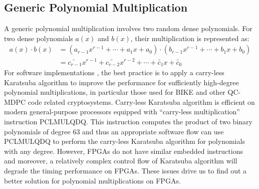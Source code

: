 \documentclass[runningheads]{llncs}
\begin{document}
\subsection{Generic Polynomial Multiplication}
\label{sub::dense}
A generic polynomial multiplication involves two random dense polynomials.
For two dense polynomials $a(x)$ and $b(x)$, their multiplication is represented as:
\begin{align}
    a(x)\cdot b(x) &= (a_{r-1}x^{r-1}+\cdots + a_{1}x + a_0)\cdot(b_{r-1}x^{r-1}+\cdots + b_{1}x + b_0)\\
    &= \widetilde{c_{r-1}}x^{r-1}+\widetilde{c_{r-2}}x^{r-2}+\cdots + \widetilde{c_{1}}x +\widetilde{c_0}
\end{align}
%
For software implementations \cite{chou2016qcbits,drucker2017toolbox}, the best practice is to apply a carry-less Karatsuba algorithm to improve the performance for sufficiently high-degree polynomial multiplications, in particular those used for BIKE and other QC-MDPC code related cryptosystems. Carry-less Karatsuba algorithm is efficient on modern general-purpose processors equipped with ``carry-less multiplication'' instruction  PCLMULQDQ. This instruction computes the product of two binary polynomials of degree 63 and thus an appropriate software flow can use PCLMULQDQ to perform the carry-less Karatsuba algorithm for polynomials with any degree. However, FPGAs do not have
similar embedded instructions and moreover, a relatively complex control flow of Karatsuba algorithm will degrade the timing performance on FPGAs. 
These issues drive us to find out a better solution for polynomial multiplications on FPGAs.
\end{document}
